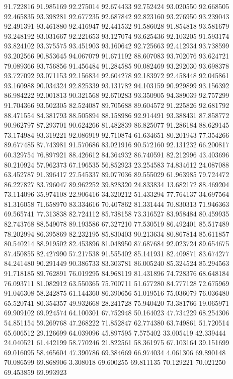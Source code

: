91.722816
91.985169
92.275014
92.674433
92.752424
93.020550
92.668505
92.465835
93.398281
92.677235
92.687842
92.823160
93.276950
93.239043
92.491391
93.461880
92.416947
92.441532
91.586028
91.854818
93.581679
93.248192
93.031667
92.221653
93.127074
93.625436
92.103205
91.593174
93.824102
93.375575
93.451903
93.160642
92.725663
92.412934
93.738599
93.202566
90.853645
94.067079
91.671192
88.607083
93.702076
93.624721
79.089366
93.756856
91.456484
91.284585
90.082469
93.292030
93.698378
93.727092
93.071153
92.156834
92.604278
92.183972
92.458448
92.045861
93.160988
90.034324
92.825339
93.131782
94.103159
90.929899
93.156392
86.984222
92.001813
90.321568
92.670283
93.350905
94.389039
92.757299
91.704366
93.502305
82.524087
89.705688
89.604572
91.225826
92.681792
88.471554
84.381793
88.505894
88.158986
92.914491
93.388431
87.858772
90.962797
87.293701
90.624266
81.482839
86.825077
91.286184
88.629145
73.174984
93.319221
92.086919
92.710874
61.634651
80.201943
77.354266
89.677485
87.743981
91.570686
83.021916
90.572160
92.131232
66.200817
60.329754
76.897921
88.426612
84.364932
86.740591
82.212996
43.403696
80.210924
57.962373
67.196535
56.852923
23.254583
74.834612
24.087088
63.452787
91.396417
27.545337
89.077036
89.555029
61.963985
79.724472
86.227827
83.796047
89.962252
39.828320
24.833834
13.682172
88.469204
73.114096
35.974108
22.906416
34.320212
51.433294
77.764137
34.697564
81.316058
71.658970
83.334616
70.407862
81.331444
70.830313
71.946363
69.565741
77.313838
82.724112
85.738158
73.316527
83.958484
80.459935
82.743768
88.549078
89.193586
67.327210
77.530519
86.492401
85.517489
78.202994
86.395869
82.232195
85.830403
90.213634
80.867814
85.611857
80.540214
88.919502
82.453896
81.048950
87.687684
92.023724
89.654675
87.450855
82.427990
57.217538
91.555402
85.141931
82.409871
83.674277
84.241480
90.291449
90.386733
83.303781
86.005240
85.324524
85.294563
91.718185
89.762891
76.019295
84.968119
81.431896
74.728376
68.648184
76.093711
81.082912
63.550365
75.700711
51.677280
84.777128
72.675969
91.046308
58.242875
61.144360
86.390656
51.019516
75.036079
76.036480
65.520741
80.354357
49.932668
28.241728
75.940420
73.381766
19.065971
69.909102
69.924574
64.100301
67.752948
50.164023
47.734229
68.254306
54.851154
59.269768
47.268222
71.852847
62.774380
63.749861
51.720514
65.606512
29.126699
64.039096
45.897595
7.575402
33.005419
42.339444
24.040521
61.442199
58.770246
21.822561
58.361975
67.103164
39.151699
69.016095
58.465604
47.390786
69.384669
66.974034
4.061306
69.890148
70.086599
69.868906
3.308018
69.600255
69.811135
70.129221
70.021250
69.453859
69.993923
